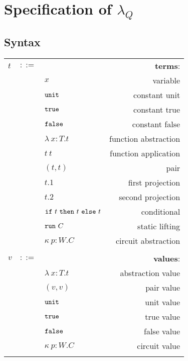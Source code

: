 \section{Specification of $\lambda_Q$}

\subsection{Syntax}

\begin{longtable}[c]{lclr}
  \label{tab:table1}\\
  \toprule
  $t$ &$::=$ &  &\textbf{terms}: \\
      & &$x$ &variable\\
      & &$\mathtt{unit}$ &constant unit\\
      & &$\mathtt{true}$ &constant true\\
      & &$\mathtt{false}$ &constant false\\
      & &$\lambda\ x:T.t$ &function abstraction\\
      & &$t\ t$ &function application\\
      & &$(t, t)$ &pair\\
      & &$t.1$ &first projection\\
      & &$t.2$ &second projection\\
      & &$\tif\ t\ \tthen\ t\ \telse\ t$ &conditional\\
      & &$\trun\ C$ &static lifting\\
      & &$\kappa \ p:W . C$ &circuit abstraction\\
  \\
  
  $v$ &$::=$ &  &\textbf{values}: \\
      & &$\lambda\ x:T.t$ &abstraction value\\
      & &$(v, v)$ &pair value\\
      & &$\mathtt{unit}$ &unit value\\
      & &$\mathtt{true}$ &true value\\
      & &$\mathtt{false}$ &false value\\
      & &$\kappa\ p:W . C$ &circuit value\\
  \\


\end{longtable}
